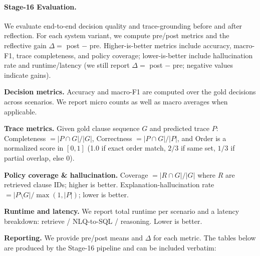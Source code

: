 ﻿%

\paragraph{Stage-16 Evaluation.}
We evaluate end-to-end decision quality and trace-grounding before and after reflection.
For each system variant, we compute pre/post metrics and the reflective gain
$\Delta =$ post $-$ pre. Higher-is-better metrics include accuracy, macro-F1,
trace completeness, and policy coverage; lower-is-better include hallucination rate
and runtime/latency (we still report $\Delta =$ post $-$ pre; negative values indicate gains).

\noindent\textbf{Decision metrics.}
Accuracy and macro-F1 are computed over the gold decisions across scenarios.
We report micro counts as well as macro averages when applicable.

\noindent\textbf{Trace metrics.}
Given gold clause sequence $G$ and predicted trace $P$:
Completeness $= |P \cap G| / |G|$,
Correctness $= |P \cap G| / |P|$,
and Order is a normalized score in $[0,1]$ (1.0 if exact order match, $2/3$ if same set, $1/3$ if partial overlap, else $0$).

\noindent\textbf{Policy coverage \& hallucination.}
Coverage $= |R \cap G|/|G|$ where $R$ are retrieved clause IDs; higher is better.
Explanation-hallucination rate $= |P \setminus G| / \max(1, |P|)$; lower is better.

\noindent\textbf{Runtime and latency.}
We report total runtime per scenario and a latency breakdown:
retrieve / NLQ-to-SQL / reasoning. Lower is better.

\noindent\textbf{Reporting.}
We provide pre/post means and $\Delta$ for each metric. The tables below are produced
by the Stage-16 pipeline and can be included verbatim:



